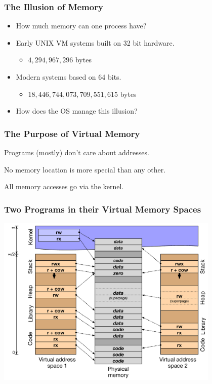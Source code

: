 \documentclass[pdftex]{beamer} %
\begin{document}
\begin{frame}
  \frametitle{The Illusion of Memory}
  \begin{itemize}
  \item How much memory can one process have?
  \item Early UNIX VM systems built on 32 bit hardware.
    \pause
    \begin{itemize}
    \item $4,294,967,296$ bytes
    \end{itemize}
    \pause
  \item Modern systems based on 64 bits.
    \begin{itemize}
    \item $18,446,744,073,709,551,615$ bytes
    \end{itemize}
  \item How does the OS manage this illusion?
  \end{itemize}
\end{frame}

\begin{frame}
  \frametitle{The Purpose of Virtual Memory}
  \begin{description}[labelwidth=\widthof{Simplification}]
  \item [Simplification] Programs (mostly) don't care about addresses.
  \item [Portability] No memory location is more special than any other.
  \item [Protection] All memory accesses go via the kernel.
  \end{description}
\end{frame}

\begin{frame}
  \frametitle{Two Programs in their Virtual Memory Spaces}

  \begin{center}
    \includegraphics[width=0.8\textwidth]{../../figures/process-address-space.pdf}
  \end{center}
\end{frame}
\end{document}
